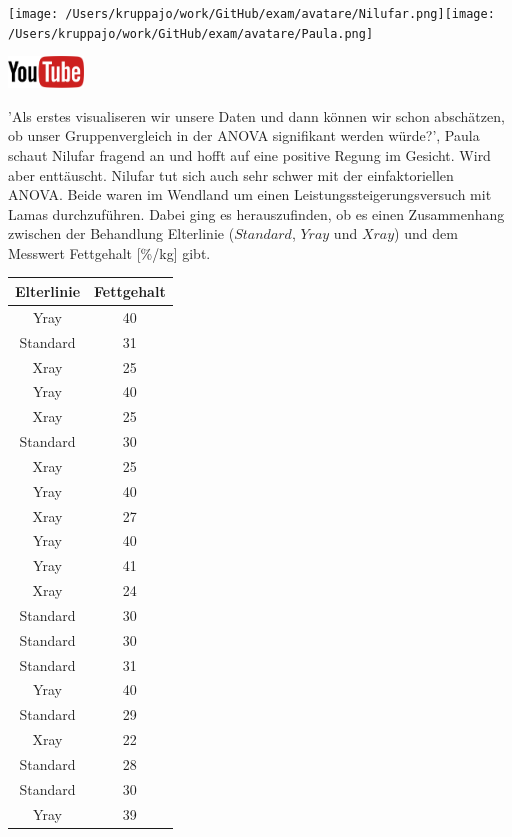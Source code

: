 \documentclass[a4paper, 9pt]{scrartcl}\usepackage[]{graphicx}\usepackage[]{xcolor}
\newenvironment{knitrout}{}{} %
\begin{document}
 
\begin{minipage}[t]{0.5\textwidth}
\texttt{[image: /Users/kruppajo/work/GitHub/exam/avatare/Nilufar.png]}\hspace{-4mm}\texttt{[image: /Users/kruppajo/work/GitHub/exam/avatare/Paula.png]}
\end{minipage}
\begin{minipage}[t]{0.5\textwidth}
\hfill
\href{https://youtu.be/kHmfEmU6lrk}{\includegraphics[width = 2cm]{img/youtube}}
\end{minipage}
\vspace{1ex}



'Als erstes visualiseren wir unsere Daten und dann können wir schon abschätzen, ob unser Gruppenvergleich in der ANOVA signifikant werden würde?', Paula schaut Nilufar fragend an und hofft auf eine positive Regung im Gesicht. Wird aber enttäuscht. Nilufar tut sich auch sehr schwer mit der einfaktoriellen ANOVA. Beide waren im Wendland um einen Leistungssteigerungsversuch mit Lamas durchzuführen. Dabei ging es herauszufinden, ob es einen Zusammenhang zwischen der Behandlung Elterlinie ($Standard$, $Yray$ und $Xray$) und dem Messwert Fettgehalt [\%/kg] gibt.

\begin{knitrout}
\color{fgcolor}\begin{table}[!h]
\centering
\begin{tabular}{cc}
\toprule
Elterlinie & Fettgehalt\\
\midrule
Yray & 40\\
Standard & 31\\
Xray & 25\\
Yray & 40\\
Xray & 25\\
\addlinespace
Standard & 30\\
Xray & 25\\
Yray & 40\\
Xray & 27\\
Yray & 40\\
\addlinespace
Yray & 41\\
Xray & 24\\
Standard & 30\\
Standard & 30\\
Standard & 31\\
\addlinespace
Yray & 40\\
Standard & 29\\
Xray & 22\\
Standard & 28\\
Standard & 30\\
\addlinespace
Yray & 39\\
\bottomrule
\end{tabular}
\end{table}

\end{knitrout}
\end{document}
